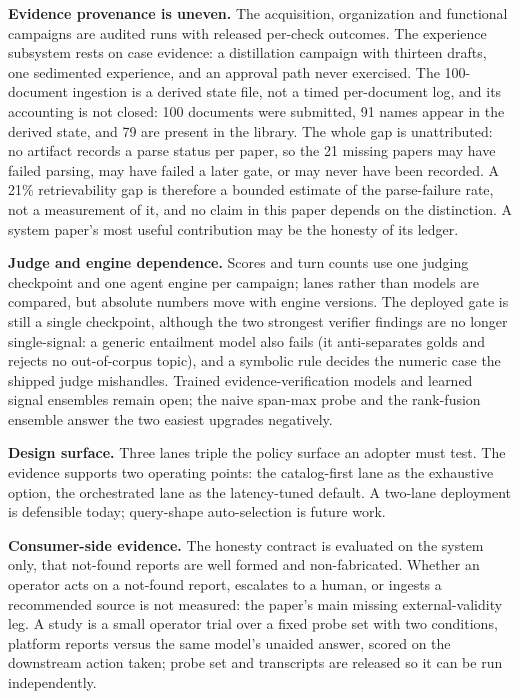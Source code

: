 \noindent\textbf{Evidence provenance is uneven.} The acquisition, organization
and functional campaigns are audited runs with released per-check outcomes. The
experience subsystem rests on case evidence: a distillation campaign with
thirteen drafts, one sedimented experience, and an approval path never
exercised. The 100-document ingestion is a derived state file, not a timed
per-document log, and its accounting is not closed: 100 documents were
submitted, 91 names appear in the derived state, and 79 are present in the
library. The whole gap is unattributed: no artifact records a parse status
per paper, so the 21 missing papers may have failed parsing, may have failed
a later gate, or may never have been recorded. A 21\% retrievability gap is
therefore a bounded estimate of the parse-failure rate, not a measurement of
it, and no claim in this paper depends on the distinction. A system paper's
most useful contribution may be the honesty
of its ledger.

\noindent\textbf{Judge and engine dependence.} Scores and turn counts use one
judging checkpoint and one agent engine per campaign; lanes rather than models
are compared, but absolute numbers move with engine versions. The deployed gate
is still a single checkpoint, although the two strongest verifier findings are
no longer single-signal: a generic entailment model also fails (it
anti-separates golds and rejects no out-of-corpus topic), and a symbolic rule
decides the numeric case the shipped judge mishandles. Trained
evidence-verification models and learned signal ensembles remain open; the naive
span-max probe and the rank-fusion ensemble answer the two easiest upgrades
negatively.

\noindent\textbf{Design surface.} Three lanes triple the policy surface an
adopter must test. The evidence supports two operating points: the catalog-first
lane as the exhaustive option, the orchestrated lane as the latency-tuned
default. A two-lane deployment is defensible today; query-shape auto-selection
is future work.

\noindent\textbf{Consumer-side evidence.} The honesty contract is evaluated on
the system only, that not-found reports are well formed and non-fabricated.
Whether an operator acts on a not-found report, escalates to a human, or ingests
a recommended source is not measured: the paper's main missing external-validity
leg. A study is a small operator trial over a fixed probe set with two
conditions, platform reports versus the same model's unaided answer, scored on
the downstream action taken; probe set and transcripts are released so it can be
run independently.

